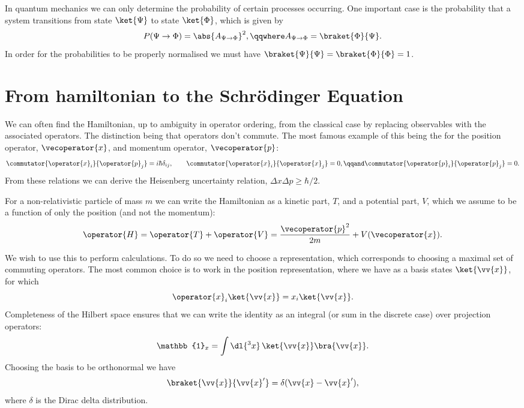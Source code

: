 \documentclass[fleqn]{NotesClass}
\newcommand*{\ident}{\mathbb{1}}
\begin{document}
    In quantum mechanics we can only determine the probability of certain processes occurring.
    One important case is the probability that a system transitions from state \(\ket{\Psi}\) to state \(\ket{\Phi}\), which is given by
    \begin{equation}
        P(\Psi \to \Phi) = \abs{A_{\Psi\to\Phi}}^2, \qqwhere A_{\Psi\to\Phi} = \braket{\Phi}{\Psi}.
    \end{equation}
    In order for the probabilities to be properly normalised we must have \(\braket{\Psi}{\Psi} = \braket{\Phi}{\Phi} = 1\).
    
    \section{From hamiltonian to the Schrödinger Equation}
    We can often find the Hamiltonian, up to ambiguity in operator ordering, from the classical case by replacing observables with the associated operators.
    The distinction being that operators don't commute.
    The most famous example of this being the  for the position operator, \(\vecoperator{x}\), and momentum operator, \(\vecoperator{p}\):
    \begin{equation}
        \commutator{\operator{x}_i}{\operator{p}_j} = i\hbar \delta_{ij}, \qquad \commutator{\operator{x}_i}{\operator{x}_j} = 0, \qqand \commutator{\operator{p}_i}{\operator{p}_j} = 0.
    \end{equation}
    From these relations we can derive the Heisenberg uncertainty relation, \(\Delta x \Delta p \ge \hbar/2\).
    
    For a non-relativistic particle of mass \(m\) we can write the Hamiltonian as a kinetic part, \(T\), and a potential part, \(V\), which we assume to be a function of only the position (and not the momentum):
    \begin{equation}
        \operator{H} = \operator{T} + \operator{V} = \frac{\vecoperator{p}^2}{2m} + V(\vecoperator{x}).
    \end{equation}
    
    We wish to use this to perform calculations.
    To do so we need to choose a representation, which corresponds to choosing a maximal set of commuting operators.
    The most common choice is to work in the position representation, where we have as a basis states \(\ket{\vv{x}}\), for which
    \begin{equation}
        \operator{x}_i\ket{\vv{x}} = x_i\ket{\vv{x}}.
    \end{equation}
    Completeness of the Hilbert space ensures that we can write the identity as an integral (or sum in the discrete case) over projection operators:
    \begin{equation}
        \ident_x = \int \dl{^3x} \, \ket{\vv{x}}\bra{\vv{x}}.
    \end{equation}
    Choosing the basis to be orthonormal we have
    \begin{equation}
        \braket{\vv{x}}{\vv{x}'} = \delta(\vv{x} - \vv{x}'),
    \end{equation}
    where \(\delta\) is the Dirac delta distribution.
    
\end{document}
